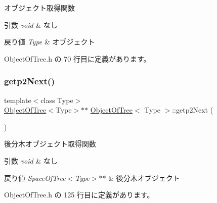 オブジェクト取得関数 


\begin{DoxyParams}{引数}
{\em void} & なし \\
\hline
\end{DoxyParams}

\begin{DoxyRetVals}{戻り値}
{\em Type} & オブジェクト \\
\hline
\end{DoxyRetVals}


 Object\+Of\+Tree.\+h の 70 行目に定義があります。

\mbox{\label{class_object_of_tree_aa7216634a8de796d6f5cc19f3cd62ed5}} 
\subsubsection{\texorpdfstring{getp2\+Next()}{getp2Next()}}
{\footnotesize\ttfamily template$<$class Type$>$ \\
\mbox{\hyperlink{class_object_of_tree}{Object\+Of\+Tree}}$<$Type$>$$\ast$$\ast$ \mbox{\hyperlink{class_object_of_tree}{Object\+Of\+Tree}}$<$ Type $>$\+::getp2\+Next (\begin{DoxyParamCaption}{ }\end{DoxyParamCaption})\hspace{0.3cm}{\ttfamily [inline]}}



後分木オブジェクト取得関数 


\begin{DoxyParams}{引数}
{\em void} & なし \\
\hline
\end{DoxyParams}

\begin{DoxyRetVals}{戻り値}
{\em Space\+Of\+Tree$<$\+Type$>$$\ast$$\ast$} & 後分木オブジェクト \\
\hline
\end{DoxyRetVals}


 Object\+Of\+Tree.\+h の 125 行目に定義があります。

\mbox{\label{class_object_of_tree_a18ec17e546c20124926726081733ee69}} 

